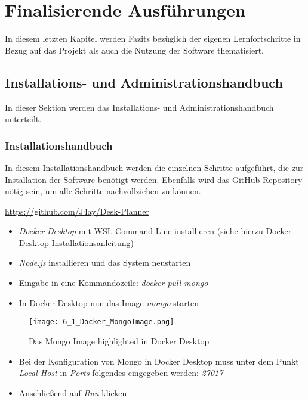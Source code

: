 \chapter{Finalisierende Ausführungen}

In diesem letzten Kapitel werden Fazits bezüglich der eigenen Lernfortschritte in Bezug auf das Projekt als auch die Nutzung der Software thematisiert.

\section{Installations- und Administrationshandbuch}

In dieser Sektion werden das Installations- und Administrationshandbuch unterteilt.

\subsection{Installationshandbuch}

In diesem Installationshandbuch werden die einzelnen Schritte aufgeführt, die zur Installation der Software benötigt werden.
Ebenfalls wird das GitHub Repository nötig sein, um alle Schritte nachvollziehen zu können.

\url{https://github.com/J4ay/Desk-Planner}

\begin{itemize}
    \item   \textit{Docker Desktop} mit WSL Command Line installieren (siehe hierzu Docker Desktop Installationsanleitung)
    \item   \textit{Node.js} installieren und das System neustarten
    \item   Eingabe in eine Kommandozeile: \textit{docker pull mongo}
    \item   In Docker Desktop nun das Image \textit{mongo} starten
\end{itemize}

\begin{figure}[!h]
    \centering
    \texttt{[image: 6\_1\_Docker\_MongoImage.png]}
    \caption{Das Mongo Image highlighted in Docker Desktop}
    \label{fig:DockerMongoImage}
\end{figure}

\begin{itemize}
    \item   Bei der Konfiguration von Mongo in Docker Desktop muss unter dem Punkt \textit{Local Host} in \textit{Ports} folgendes eingegeben werden: \textit{27017}
    \item   Anschließend auf \textit{Run} klicken 
\end{itemize}

